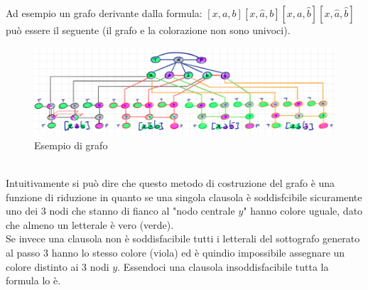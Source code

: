 \documentclass[a4paper]{article}
\begin{document}
Ad esempio un grafo derivante dalla formula: $[x,a,b][x,\hat a, b][x,a,\hat b][x, \hat a, \hat b]$ può essere il seguente (il grafo e la colorazione non sono univoci).
		\begin{figure}[!ht]
		\centering
		\includegraphics[width = 1\textwidth]{./img/E10_finale.png}
		\caption{Esempio di grafo} \label{FIG:E10_finale}
		\end{figure}\\
Intuitivamente si può dire che questo metodo di costruzione del grafo è una funzione di riduzione in quanto se una singola clausola è soddisfcibile sicuramente uno dei 3 nodi che stanno di fianco al "nodo centrale $y$" hanno colore uguale, dato che almeno un letterale è vero (verde).\\
Se invece una clausola non è soddisfacibile tutti i letterali del sottografo generato al passo 3 hanno lo stesso colore (viola) ed è quindio impossibile assegnare un colore distinto ai 3 nodi $y$.
Essendoci una clausola insoddisfacibile tutta la formula lo è.
\end{document}
